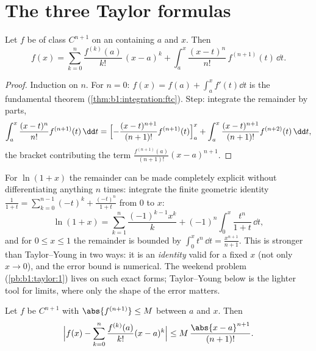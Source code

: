 \section{The three Taylor formulas}

\begin{theorem}\label{thm:b1:taylor:integral}
Let $f$ be of class $C^{n+1}$ on an  containing $a$ and $x$.
Then
\[
f(x) = \sum_{k=0}^{n} \frac{f^{(k)}(a)}{k!}\,(x - a)^k
+ \int_a^x \frac{(x - t)^n}{n!}\, f^{(n+1)}(t)\, \dd t .
\]
\end{theorem}

\begin{proof}
Induction on $n$. For $n = 0$: $f(x) = f(a) + \int_a^x f'(t)\dd t$ is
the fundamental theorem (\cref{thm:b1:integration:ftc}). Step:
integrate the remainder by parts,
\[
\int_a^x \frac{(x-t)^n}{n!} f^{(n+1)}(t)\,\dd t
= \Bigl[-\frac{(x-t)^{n+1}}{(n+1)!} f^{(n+1)}(t)\Bigr]_a^x
+ \int_a^x \frac{(x-t)^{n+1}}{(n+1)!} f^{(n+2)}(t)\,\dd t ,
\]
the bracket contributing the term $\frac{f^{(n+1)}(a)}{(n+1)!}(x -
a)^{n+1}$.
\end{proof}

\begin{example}\label{ex:b1:taylor:lnexact}
For $\ln(1 + x)$ the  remainder can be made completely
explicit without differentiating anything $n$ times: integrate
the finite geometric identity $\frac{1}{1+t} =
\sum_{k=0}^{n-1}(-t)^k + \frac{(-t)^n}{1+t}$ from $0$ to $x$:
\[
\ln(1 + x) = \sum_{k=1}^{n} \frac{(-1)^{k-1}x^k}{k}
+ (-1)^n \int_0^x \frac{t^n}{1 + t}\,\dd t ,
\]
and for $0 \leq x \leq 1$ the remainder is bounded by $\int_0^x
t^n\,\dd t = \frac{x^{n+1}}{n+1}$. This is stronger than
Taylor--Young in two ways: it is an \emph{identity} valid for a
fixed $x$ (not only $x \to 0$), and the error bound is numerical.
The weekend problem (\cref{pb:b1:taylor:1}) lives on such exact
forms; Taylor--Young below is the lighter tool for limits, where
only the shape of the error matters.
\end{example}

\begin{theorem}\label{thm:b1:taylor:lagrange}
Let $f$ be $C^{n+1}$ with $\abs{f^{(n+1)}} \leq M$ between $a$ and
$x$. Then
\[
\Bigl| f(x) - \sum_{k=0}^{n} \frac{f^{(k)}(a)}{k!}(x-a)^k \Bigr|
\leq M\, \frac{\abs{x - a}^{n+1}}{(n+1)!} .
\]
\end{theorem}

